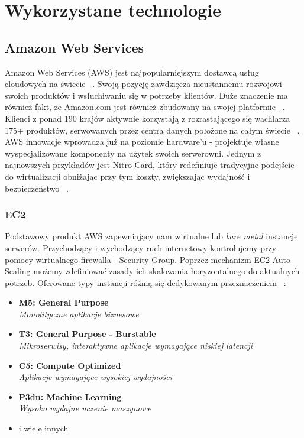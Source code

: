 \chapter{Wykorzystane technologie}
\label{cha:tech-stack}

\section{Amazon Web Services}
Amazon Web Services (AWS) jest najpopularniejszym dostawcą usług cloudowych na świecie ~\cite{AWS-what}. 
Swoją pozycję zawdzięcza nieustannemu rozwojowi swoich produktów i wsłuchiwaniu się w potrzeby klientów.
Duże znaczenie ma również fakt, że Amazon.com jest również zbudowany na swojej platformie ~\cite{AS3}.
Klienci z ponad 190 krajów aktywnie korzystają z rozrastającego się wachlarza 175+ produktów, serwowanych przez centra danych położone na całym świecie ~\cite{AWS-O}.
AWS innowacje wprowadza już na poziomie hardware'u - projektuje własne wyspecjalizowane komponenty na użytek swoich serwerowni.
Jednym z najnowszych przykładów jest Nitro Card, 
który redefiniuje tradycyjne podejście do wirtualizacji obniżając przy tym koszty, zwiększając wydajność i bezpieczeństwo ~\cite{AWS-Nitro}.

\subsection{EC2}
Podstawowy produkt AWS zapewniający nam wirtualne lub {\em bare metal} instancje serwerów. 
Przychodzący i wychodzący ruch internetowy kontrolujemy przy pomocy wirtualnego firewalla - Security Group.
Poprzez mechanizm EC2 Auto Scaling możemy zdefiniować zasady ich skalowania horyzontalnego do aktualnych potrzeb.
Oferowane typy instancji różnią się dedykowanym przeznaczeniem ~\cite{AWS-Nitro}:

\begin{itemize}
    \item
    \textbf{M5: General Purpose}\\
    {\em Monolityczne aplikacje biznesowe}
    
    \item
    \textbf{T3: General Purpose - Burstable}\\
    {\em Mikroserwisy, interaktywne aplikacje wymagające niskiej latencji}

    \item
    \textbf{C5: Compute Optimized}\\
    {\em Aplikacje wymagające wysokiej wydajności}

    \item
    \textbf{P3dn: Machine Learning}\\
    {\em Wysoko wydajne uczenie maszynowe}

    \item
    i wiele innych
\end{itemize} 

